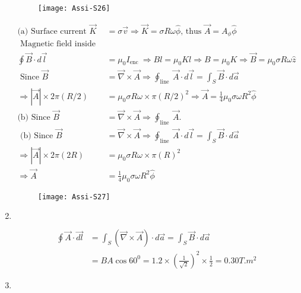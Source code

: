\begin{enumerate}
\begin{answer}
\begin{figure}[H]
			\centering
			\texttt{[image: Assi-S26]}
		\end{figure}
		\begin{align*}
		\text{(a) Surface current }\vec{K}&=\sigma \vec{v} \Rightarrow \vec{K}=\sigma R \omega \hat{\phi}\text{, thus }\vec{A}=A_{\phi} \hat{\phi}\\
	\text{	Magnetic field inside is}&\\
		\oint \vec{B} \cdot d \vec{l}&=\mu_{0} I_{\text {enc }} \Rightarrow B l=\mu_{0} K l \Rightarrow B=\mu_{0} K \Rightarrow \vec{B}=\mu_{0} \sigma R \omega \hat{z} \\
		\text { Since } \vec{B}&=\vec{\nabla} \times \vec{A} \Rightarrow \oint_{\text {line }} \vec{A} \cdot d \vec{l}=\int_{S} \vec{B} \cdot d \vec{a} \\
		\Rightarrow|\vec{A}| \times 2 \pi(R / 2)&=\mu_{0} \sigma R \omega \times \pi(R / 2)^{2} \Rightarrow \vec{A}=\frac{1}{4} \mu_{0} \sigma \omega R^{2} \hat{\phi}\\
		\text{(b) Since }\vec{B}&=\vec{\nabla} \times \vec{A} \Rightarrow \oint_{\text {line }} \vec{A}.\\
		\text { (b) Since } \vec{B}&=\vec{\nabla} \times \vec{A} \Rightarrow \oint_{\text {line }} \vec{A} \cdot d \vec{l}=\int_{S} \vec{B} \cdot d \vec{a} \\
		\Rightarrow|\vec{A}| \times 2 \pi(2 R)&=\mu_{0} \sigma R \omega \times \pi(R)^{2} \\
		\Rightarrow \vec{A}&=\frac{1}{4} \mu_{0} \sigma \omega R^{2} \hat{\phi}
		\end{align*}
			\begin{figure}[H]
			\centering
			\texttt{[image: Assi-S27]}
		\end{figure}
	\end{answer}
	\item $\left. \right. $
	\begin{answer}
		\begin{align*}
		\oint \vec{A} \cdot \overrightarrow{d l}&=\int_{S}(\vec{\nabla} \times \vec{A}) \cdot d \vec{a}=\int_{S} \vec{B} \cdot d \vec{a}\\&=B A \cos 60^{0}=1.2 \times\left(\frac{1}{\sqrt{2}}\right)^{2} \times \frac{1}{2}=0.30 T . m^{2}
		\end{align*}
	\end{answer}
	\item $\left. \right. $
	\begin{answer}
		\begin{align*}

\end{align*}
\end{answer}
\end{enumerate}
